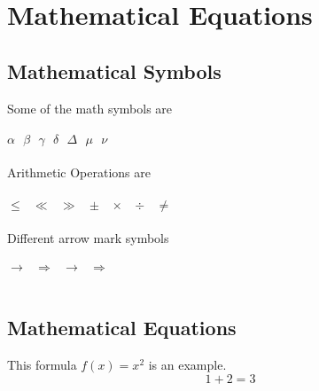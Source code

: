 \documentclass[a4paper,12pt]{article}
\begin{document}
\section{Mathematical Equations}
\subsection{Mathematical Symbols}
Some of the math symbols are \\
\\
$\alpha~~~\beta~~~\gamma~~~\delta~~~\Delta~~~\mu~~~\nu$\\
\\
Arithmetic Operations are \\
\\
$\leq~~~\ll~~~\gg~~~\pm~~~\times~~~\div~~~\neq$\\
\\
Different arrow mark symbols\\
\\
$\rightarrow~~~\Rightarrow~~~\longrightarrow~~~\Longrightarrow$\\
\\
\subsection{Mathematical Equations}
This formula $f(x) = x^2$ is an example.
\\
\begin{equation*}
  1 + 2 = 3 
\end{equation*}
\end{document}
